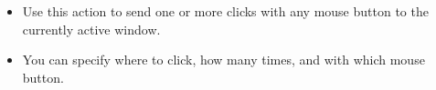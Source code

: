 
\begin{itemize}
\item Use this action to send one or more clicks with any mouse button to the currently active window. 
\item You can specify where to click, how many times, and with which mouse button. 
\end{itemize}
